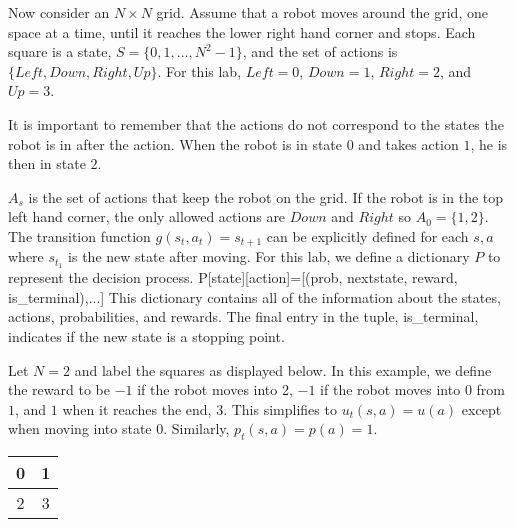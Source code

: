 Now consider an $N \times N$ grid.
Assume that a robot moves around the grid, one space at a time, until it reaches the lower right hand corner and stops.
Each square is a state, $S = \{0, 1, \ldots, N^2-1\}$, and the set of actions is $\{Left, Down, Right, Up\}$.
For this lab, $Left = 0$, $Down = 1$, $Right = 2$, and $Up = 3$. 

\begin{warn}
It is important to remember that the actions do not correspond to the states the robot is in after the action. 
When the robot is in state $0$ and takes action $1$, he is then in state $2$.
\end{warn}

$A_s$ is the set of actions that keep the robot on the grid.
If the robot is in the top left hand corner, the only allowed actions are $Down$ and $Right$ so $A_0 = \{1,2\}$.
The transition function $g(s_t,a_t) = s_{t+1}$ can be explicitly defined for each $s, a$ where $s_{t_1}$ is the new state after moving.
For this lab, we define a dictionary $P$ to represent the decision process.
P[state][action]=[(prob, nextstate, reward, is\_terminal),...]
This dictionary contains all of the information about the states, actions, probabilities, and rewards.
The final entry in the tuple, is\_terminal, indicates if the new state is a stopping point.

Let $N=2$ and label the squares as displayed below.
In this example, we define the reward to be $-1$ if the robot moves into 2, $-1$ if the robot moves into $0$ from $1$, and $1$ when it reaches the end, $3$.
This simplifies to $u_t(s,a) = u(a)$ except when moving into state $0$.
Similarly, $p_t(s,a) = p(a) = 1$.

\begin{center}
\begin{tabular}{|c|c|}
\hline
0 & 1 \\ \hline
\cellcolor{red!20}2 & \cellcolor{green!20}3 \\ \hline
\end{tabular}
\end{center}


